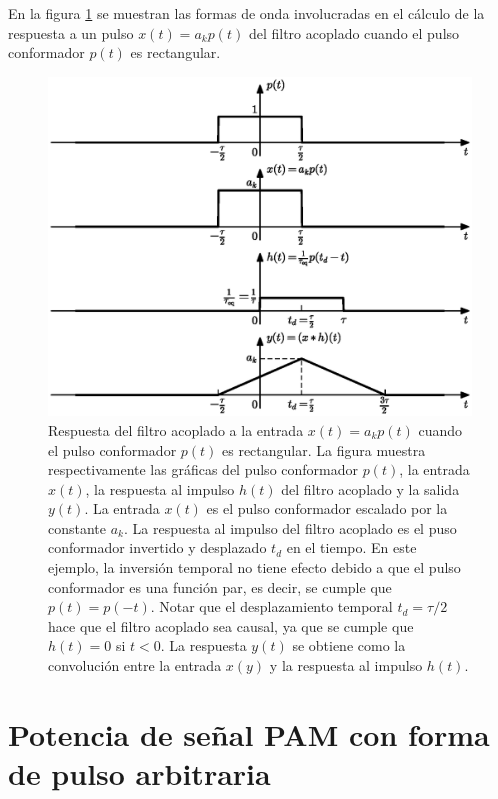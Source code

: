 \documentclass[a4paper]{article}
\begin{document}
En la figura \ref{fig:matched_filter_square_pulse_output} se muestran las formas de onda involucradas en el cálculo de la respuesta a un pulso \(x(t)=a_kp(t)\) del filtro acoplado cuando el pulso conformador \(p(t)\) es rectangular.
\begin{figure}[!htb]
\begin{center}
\includegraphics[width=0.9\columnwidth]{figuras/matched_filter_square_pulse_output.eps}
\caption{\label{fig:matched_filter_square_pulse_output} Respuesta del filtro acoplado a la entrada  \(x(t)=a_kp(t)\) cuando el pulso conformador \(p(t)\) es rectangular. La figura muestra respectivamente las gráficas del pulso conformador \(p(t)\), la entrada \(x(t)\), la respuesta al impulso \(h(t)\) del filtro acoplado y la salida \(y(t)\). La entrada \(x(t)\) es el pulso conformador escalado por la constante \(a_k\). La respuesta al impulso del filtro acoplado es el puso conformador invertido y desplazado \(t_d\) en el tiempo. En este ejemplo, la inversión temporal no tiene efecto debido a que el pulso conformador es una función par, es decir, se cumple que \(p(t)=p(-t)\). Notar que el desplazamiento temporal \(t_d=\tau/2\) hace que el filtro acoplado sea causal, ya que se cumple que \(h(t)=0\) si \(t<0\). La respuesta \(y(t)\) se obtiene como la convolución entre la entrada \(x(y)\) y la respuesta al impulso \(h(t)\).}
\end{center}
\end{figure}
 
\section{Potencia de señal PAM con forma de pulso arbitraria}\label{ap:pam_signal_power}
 
\end{document}
